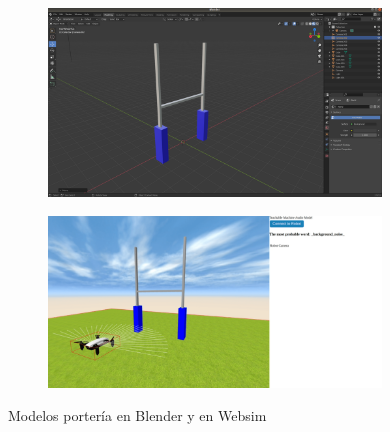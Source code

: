  \begin{figure}[H]
  \begin{subfigure}[b]{0.5\textwidth}
  \centering
    \includegraphics[width=0.97\textwidth, height=0.7\textwidth]{chapters/images/porteriablender.png}
    \caption{}
    \label{fig:f1}
  \end{subfigure}
  \hfill
  \begin{subfigure}[b]{0.5\textwidth}
  \centering
    \includegraphics[width=0.97\textwidth, height=0.7\textwidth]{chapters/images/porteriawebsim.png}
	\caption{}    
    \label{fig:f2}
 
  \end{subfigure}
  \caption{Modelos portería en Blender y  en Websim }
\end{figure}


